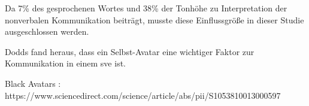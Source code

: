 \documentclass[a4paper,11pt]{article}%
\renewcommand{\\}{\vspace*{0.5\baselineskip} \newline}
\begin{document}
Da 7\% des gesprochenen Wortes und 38\% der Tonhöhe zu Interpretation der nonverbalen Kommunikation beiträgt, musste diese Einflussgröße in dieser Studie ausgeschlossen werden.

			Dodds fand heraus, dass ein Selbst-Avatar eine wichtiger Faktor zur Kommunikation in einem \ac{sve} ist. \citep[1-11]{dodds2011talk}
			
			Black Avatars :
			https://www.sciencedirect.com/science/article/abs/pii/S1053810013000597

%
\end{document}
